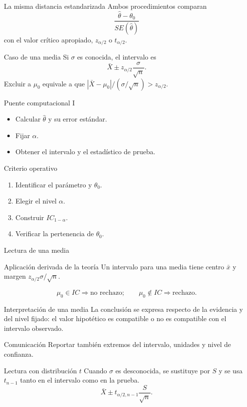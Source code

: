 \documentclass[10pt,aspectratio=169]{beamer}
\begin{document}
\begin{frame}{La misma distancia estandarizada}\small
Ambos procedimientos comparan
\[\frac{\hat\theta-\theta_0}{SE(\hat\theta)}\]
con el valor crítico apropiado, $z_{\alpha/2}$ o $t_{\alpha/2}$.
\end{frame}
\begin{frame}{Caso de una media}\small
Si $\sigma$ es conocida, el intervalo es
\[\bar X\pm z_{\alpha/2}\frac{\sigma}{\sqrt n}.\]
Excluir a $\mu_0$ equivale a que $|\bar X-\mu_0|/(\sigma/\sqrt n)>z_{\alpha/2}$.
\end{frame}
\begin{frame}{Puente computacional I}\small
\begin{itemize}\item Calcular $\hat\theta$ y su error estándar.\item Fijar $\alpha$.\item Obtener el intervalo y el estadístico de prueba.\end{itemize}
\end{frame}
\begin{frame}{Criterio operativo}\small
\begin{enumerate}\item Identificar el parámetro y $\theta_0$.\item Elegir el nivel $\alpha$.\item Construir $IC_{1-\alpha}$.\item Verificar la pertenencia de $\theta_0$.\end{enumerate}
\end{frame}
\begin{frame}{Lectura de una media}\small
\begin{block}{Aplicación derivada de la teoría} Un intervalo para una media tiene centro $\bar x$ y margen $z_{\alpha/2}\sigma/\sqrt n$.\end{block}
\[\mu_0\in IC\Rightarrow\text{no rechazo};\qquad\mu_0\notin IC\Rightarrow\text{rechazo}.\]
\end{frame}
\begin{frame}{Interpretación de una media}\small
La conclusión se expresa respecto de la evidencia y del nivel fijado: el valor hipotético es compatible o no es compatible con el intervalo observado.
\begin{alertblock}{Comunicación} Reportar también extremos del intervalo, unidades y nivel de confianza.\end{alertblock}
\end{frame}
\begin{frame}{Lectura con distribución $t$}\small
Cuando $\sigma$ es desconocida, se sustituye por $S$ y se usa $t_{n-1}$ tanto en el intervalo como en la prueba.
\[\bar X\pm t_{\alpha/2,n-1}\frac{S}{\sqrt n}.\]
\end{frame}
\end{document}
